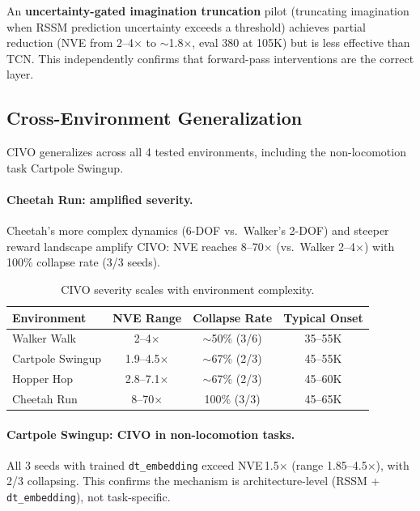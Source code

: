 \documentclass[10pt,letterpaper]{article}
\begin{document}
An \textbf{uncertainty-gated imagination truncation} pilot (truncating imagination when RSSM prediction uncertainty exceeds a threshold) achieves partial reduction (NVE from 2--4$\times$ to $\sim$1.8$\times$, eval 380 at 105K) but is less effective than TCN.
This independently confirms that forward-pass interventions are the correct layer.

\subsection{Cross-Environment Generalization}
\label{sec:cross_env}

CIVO generalizes across all 4 tested environments, including the non-locomotion task Cartpole Swingup.

\paragraph{Cheetah Run: amplified severity.}
Cheetah's more complex dynamics (6-DOF vs.\ Walker's 2-DOF) and steeper reward landscape amplify CIVO: NVE reaches 8--70$\times$ (vs.\ Walker 2--4$\times$) with 100\% collapse rate (3/3 seeds).

\begin{table}[h]
\centering
\caption{CIVO severity scales with environment complexity.}
\label{tab:severity_cross_env}
\small
\begin{tabular}{@{}lccc@{}}
\toprule
Environment & NVE Range & Collapse Rate & Typical Onset \\
\midrule
Walker Walk      & 2--4$\times$   & $\sim$50\% (3/6)  & 35--55K \\
Cartpole Swingup & 1.9--4.5$\times$ & $\sim$67\% (2/3) & 45--55K \\
Hopper Hop       & 2.8--7.1$\times$ & $\sim$67\% (2/3) & 45--60K \\
Cheetah Run      & 8--70$\times$  & 100\% (3/3)        & 45--65K \\
\bottomrule
\end{tabular}
\end{table}

\paragraph{Cartpole Swingup: CIVO in non-locomotion tasks.}
All 3 seeds with trained \texttt{dt\_embedding} exceed NVE\,1.5$\times$ (range 1.85--4.5$\times$), with 2/3 collapsing.
This confirms the mechanism is architecture-level (RSSM + \texttt{dt\_embedding}), not task-specific.
\end{document}
